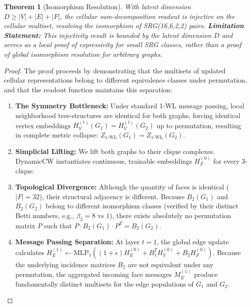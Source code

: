 \documentclass[11pt, letterpaper]{article}
\newtheorem{theorem}{Theorem}[section]
\begin{document}
\begin{theorem}[Isomorphism Resolution]
With latent dimension $D \ge |V|+|E|+|F|$, the cellular sum-decomposition readout is injective on the cellular multiset, resolving the isomorphism of SRG(16,6,2,2) pairs. \textbf{Limitation Statement:} This injectivity result is bounded by the latent dimension $D$ and serves as a local proof of expressivity for small SRG classes, rather than a proof of global isomorphism resolution for arbitrary graphs.
\end{theorem}
\begin{proof}
The proof proceeds by demonstrating that the multisets of updated cellular representations belong to different equivalence classes under permutation, and that the readout function maintains this separation:
\begin{enumerate}
    \item \textbf{The Symmetry Bottleneck:} Under standard 1-WL message passing, local neighborhood tree-structures are identical for both graphs, forcing identical vertex embeddings $H_V^{(t)}(G_1) = H_V^{(t)}(G_2)$ up to permutation, resulting in complete metric collapse: $Z_{1\text{-WL}}(G_1) = Z_{1\text{-WL}}(G_2)$.
    \item \textbf{Simplicial Lifting:} We lift both graphs to their clique complexes. DynamicCW instantiates continuous, trainable embeddings $H_F^{(0)}$ for every 3-clique. 
    \item \textbf{Topological Divergence:} Although the quantity of faces is identical ($|F|=32$), their structural adjacency is different. Because $B_2(G_1)$ and $B_2(G_2)$ belong to different isomorphism classes (verified by their distinct Betti numbers, e.g., $\beta_2 = 8$ vs $1$), there exists absolutely no permutation matrix $P$ such that $P \cdot B_2(G_1) \cdot P^T = B_2(G_2)$.
    \item \textbf{Message Passing Separation:} At layer $t=1$, the global edge update calculates $H_E^{(1)} \leftarrow \text{MLP}_1((1+\epsilon)H_E^{(0)} + B_1^TH_V^{(0)} + B_2H_F^{(0)})$. Because the underlying incidence matrices $B_2$ are not equivalent under any permutation, the aggregated incoming face messages $M_E^{(1)}$ produce fundamentally distinct multisets for the edge populations of $G_1$ and $G_2$.

\end{enumerate}
\end{proof}
\end{document}
